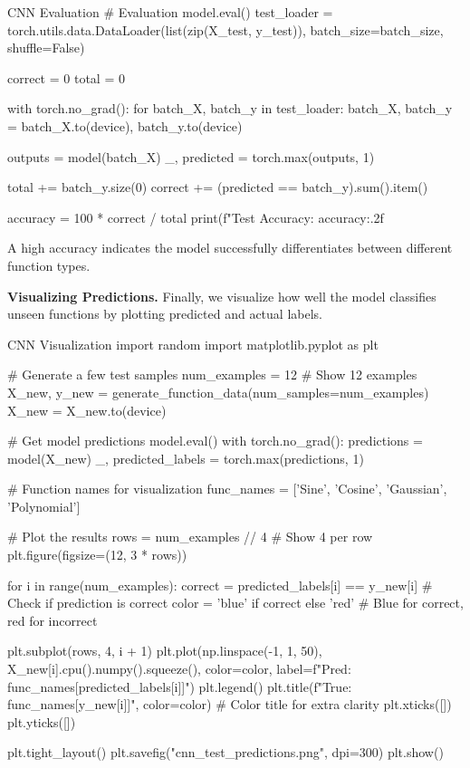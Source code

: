 \begin{codeonly}{CNN Evaluation}
# Evaluation
model.eval()
test_loader = torch.utils.data.DataLoader(list(zip(X_test, y_test)), batch_size=batch_size, shuffle=False)

correct = 0
total = 0

with torch.no_grad():
    for batch_X, batch_y in test_loader:
        batch_X, batch_y = batch_X.to(device), batch_y.to(device)

        outputs = model(batch_X)
        _, predicted = torch.max(outputs, 1)

        total += batch_y.size(0)
        correct += (predicted == batch_y).sum().item()

accuracy = 100 * correct / total
print(f"Test Accuracy: {accuracy:.2f}%
\end{codeonly}

A high accuracy indicates the model successfully differentiates between different function types.

{\bf Visualizing Predictions.} Finally, we visualize how well the model classifies unseen functions by plotting predicted and actual labels.

\begin{codeonly}{CNN Visualization}
import random
import matplotlib.pyplot as plt

# Generate a few test samples
num_examples = 12  # Show 12 examples
X_new, y_new = generate_function_data(num_samples=num_examples)
X_new = X_new.to(device)

# Get model predictions
model.eval()
with torch.no_grad():
    predictions = model(X_new)
    _, predicted_labels = torch.max(predictions, 1)

# Function names for visualization
func_names = ['Sine', 'Cosine', 'Gaussian', 'Polynomial']

# Plot the results
rows = num_examples // 4  # Show 4 per row
plt.figure(figsize=(12, 3 * rows))

for i in range(num_examples):
    correct = predicted_labels[i] == y_new[i]  # Check if prediction is correct
    color = 'blue' if correct else 'red'  # Blue for correct, red for incorrect

    plt.subplot(rows, 4, i + 1)
    plt.plot(np.linspace(-1, 1, 50), X_new[i].cpu().numpy().squeeze(), color=color, label=f"Pred: {func_names[predicted_labels[i]]}")
    plt.legend()
    plt.title(f"True: {func_names[y_new[i]]}", color=color)  # Color title for extra clarity
    plt.xticks([])
    plt.yticks([])

plt.tight_layout()
plt.savefig("cnn_test_predictions.png", dpi=300)
plt.show()
\end{codeonly}


